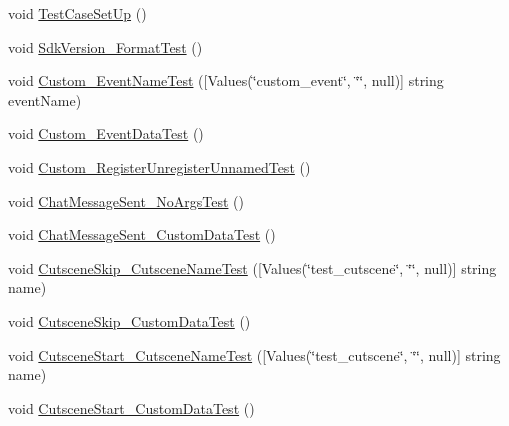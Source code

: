 \begin{DoxyCompactItemize}
void \mbox{\hyperlink{class_unity_engine_1_1_analytics_1_1_tests_1_1_analytics_event_tests_a553b95270ae65bec0dd15863d17f22ea}{Test\+Case\+Set\+Up}} ()
\item 
void \mbox{\hyperlink{class_unity_engine_1_1_analytics_1_1_tests_1_1_analytics_event_tests_ab9cd8ef42fd7277fd37f5e264f1cbc69}{Sdk\+Version\+\_\+\+Format\+Test}} ()
\item 
void \mbox{\hyperlink{class_unity_engine_1_1_analytics_1_1_tests_1_1_analytics_event_tests_a0b766c186a91a0e151a63377c83c4821}{Custom\+\_\+\+Event\+Name\+Test}} (\mbox{[}Values(\char`\"{}custom\+\_\+event\char`\"{}, \char`\"{}\char`\"{}, null)\mbox{]} string event\+Name)
\item 
void \mbox{\hyperlink{class_unity_engine_1_1_analytics_1_1_tests_1_1_analytics_event_tests_a8089da4c2a1bc5acbe6684e7646c02a8}{Custom\+\_\+\+Event\+Data\+Test}} ()
\item 
void \mbox{\hyperlink{class_unity_engine_1_1_analytics_1_1_tests_1_1_analytics_event_tests_a993564f0d45efa87f1b097b2ddfa87e5}{Custom\+\_\+\+Register\+Unregister\+Unnamed\+Test}} ()
\item 
void \mbox{\hyperlink{class_unity_engine_1_1_analytics_1_1_tests_1_1_analytics_event_tests_a0d926a8bdafbecf3442deac686f7b8f8}{Chat\+Message\+Sent\+\_\+\+No\+Args\+Test}} ()
\item 
void \mbox{\hyperlink{class_unity_engine_1_1_analytics_1_1_tests_1_1_analytics_event_tests_a8b81b319a80b3488bc2688038619f1f8}{Chat\+Message\+Sent\+\_\+\+Custom\+Data\+Test}} ()
\item 
void \mbox{\hyperlink{class_unity_engine_1_1_analytics_1_1_tests_1_1_analytics_event_tests_a5858b8617a45bdb4aac674f89aa3ecaa}{Cutscene\+Skip\+\_\+\+Cutscene\+Name\+Test}} (\mbox{[}Values(\char`\"{}test\+\_\+cutscene\char`\"{}, \char`\"{}\char`\"{}, null)\mbox{]} string name)
\item 
void \mbox{\hyperlink{class_unity_engine_1_1_analytics_1_1_tests_1_1_analytics_event_tests_a795cb63a4bc7a8ebdad1d08c80db6edb}{Cutscene\+Skip\+\_\+\+Custom\+Data\+Test}} ()
\item 
void \mbox{\hyperlink{class_unity_engine_1_1_analytics_1_1_tests_1_1_analytics_event_tests_a6817d2373b2266b97dd2db3392467857}{Cutscene\+Start\+\_\+\+Cutscene\+Name\+Test}} (\mbox{[}Values(\char`\"{}test\+\_\+cutscene\char`\"{}, \char`\"{}\char`\"{}, null)\mbox{]} string name)
\item 
void \mbox{\hyperlink{class_unity_engine_1_1_analytics_1_1_tests_1_1_analytics_event_tests_a6ec6e4410250d363493f5789faeaff42}{Cutscene\+Start\+\_\+\+Custom\+Data\+Test}} ()

\end{DoxyCompactItemize}
